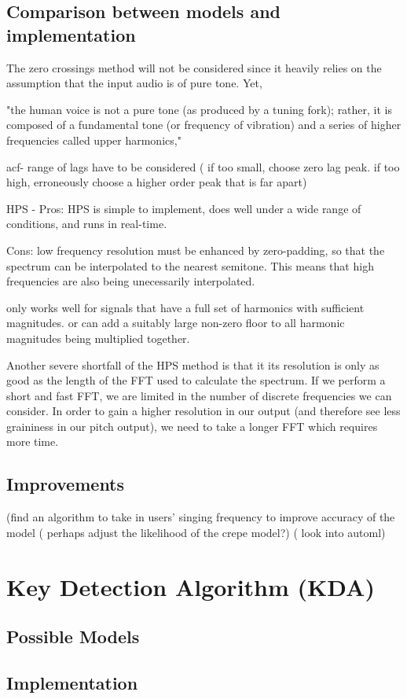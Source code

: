 \subsection{Comparison between models and implementation}
The zero crossings method will not be considered since it heavily relies on the assumption that the input audio is of pure tone. Yet,


"the human voice is not a pure tone (as produced by a tuning fork); rather, it is composed of a fundamental tone (or frequency of vibration) and a series of higher frequencies called upper harmonics," \cite{humanmono}

acf- range of lags have to be considered ( if too small, choose zero lag peak. if too high, erroneously choose a higher order peak that is far apart)

HPS - Pros: HPS is simple to implement, does well under a wide range of conditions, and runs in real-time.

Cons: low frequency resolution must be enhanced by zero-padding, so that the spectrum can be interpolated to the nearest semitone. This means that high frequencies are also being unecessarily interpolated.

only works well for signals that have a full set of harmonics with sufficient magnitudes.
or can add a suitably large non-zero floor to all harmonic magnitudes being multiplied together.

Another severe shortfall of the HPS method is that it its resolution is only as good as the length of the FFT used to calculate the spectrum. If we perform a short and fast FFT, we are limited in the number of discrete frequencies we can consider. In order to gain a higher resolution in our output (and therefore see less graininess in our pitch output), we need to take a longer FFT which requires more time.




\subsection{Improvements}
(find an algorithm to take in users’ singing frequency to improve accuracy of the model ( perhaps adjust the likelihood of the crepe model?) ( look into automl)

\section{Key Detection Algorithm (KDA)}

\subsection{Possible Models}


\subsection{Implementation}
